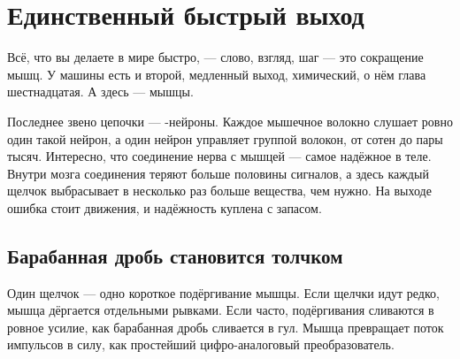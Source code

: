 \chapter{Единственный быстрый выход}

Всё, что вы делаете в мире быстро, --- слово, взгляд, шаг --- это сокращение мышц. У машины есть и второй, медленный выход, химический, о нём глава шестнадцатая. А здесь --- мышцы.

Последнее звено цепочки --- -нейроны. Каждое мышечное волокно слушает ровно один такой нейрон, а один нейрон управляет группой волокон, от сотен до пары тысяч. Интересно, что соединение нерва с мышцей --- самое надёжное в теле. Внутри мозга соединения теряют больше половины сигналов, а здесь каждый щелчок выбрасывает в несколько раз больше вещества, чем нужно. На выходе ошибка стоит движения, и надёжность куплена с запасом.

\section*{Барабанная дробь становится толчком}

Один щелчок --- одно короткое подёргивание мышцы. Если щелчки идут редко, мышца дёргается отдельными рывками. Если часто, подёргивания сливаются в ровное усилие, как барабанная дробь сливается в гул. Мышца превращает поток импульсов в силу, как простейший цифро-аналоговый преобразователь.

